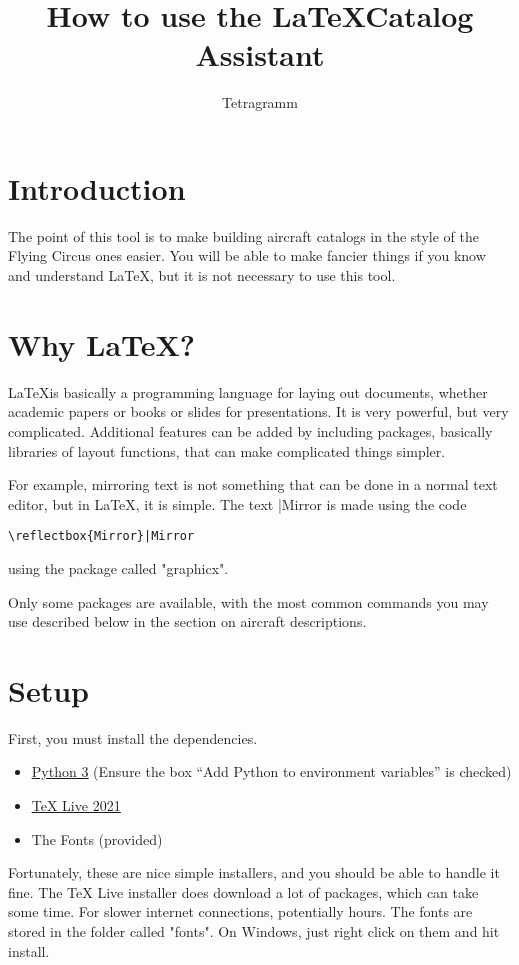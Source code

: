 \documentclass{article}
\title{How to use the \LaTeX Catalog Assistant}
\author{Tetragramm}
\begin{document}
\maketitle
\section{Introduction}
The point of this tool is to make building aircraft catalogs in the style of the Flying Circus ones easier.  You will be able to make fancier things if you know and understand \LaTeX, but it is not necessary to use this tool.
\section{Why \LaTeX?}
\LaTeX is basically a programming language for laying out documents, whether academic papers or books or slides for presentations.  It is very powerful, but very complicated.  Additional features can be added by including packages, basically libraries of layout functions, that can make complicated things simpler.

For example, mirroring text is not something that can be done in a normal text editor, but in \LaTeX, it is simple.  The text |Mirror is made using the code \begin{verbatim}\reflectbox{Mirror}|Mirror\end{verbatim} using the package called "graphicx".

Only some packages are available, with the most common commands you may use described below in the section on aircraft descriptions.
\section{Setup}
First, you must install the dependencies.
\begin{itemize}
        \item \href{https://www.python.org/}{\color{blue}\underline{Python 3}}  (Ensure the box ``Add Python to environment variables'' is checked)
        \item \href{https://tug.org/texlive/}{\color{blue}\underline{TeX Live 2021}}
        \item The Fonts (provided)
\end{itemize}
Fortunately, these are nice simple installers, and you should be able to handle it fine.  The TeX Live installer does download a lot of packages, which can take some time.  For slower internet connections, potentially hours.  The fonts are stored in the folder called "fonts".  On Windows, just right click on them and hit install.
\end{document}
